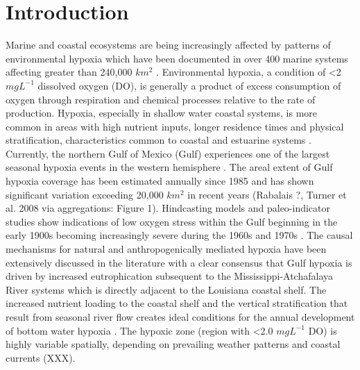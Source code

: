 \documentclass[10pt]{article}
\begin{document}
\section*{Introduction}
Marine and coastal ecosystems are being increasingly affected by patterns of environmental hypoxia which have been documented in over 400 marine systems affecting greater than 240,000 $km^{2}$ \cite{diaz_spreading_2008}.  Environmental hypoxia, a condition of \textless 2 $ mg{} L^{-1} $ dissolved oxygen (DO), is generally a product of excess consumption of oxygen through respiration and chemical processes relative to the rate of production.  Hypoxia, especially in shallow water coastal systems, is more common in areas with high nutrient inputs, longer residence times and physical stratification, characteristics common to coastal and estuarine systems \cite{rabalais_global_2009}.  Currently, the northern Gulf of Mexico (Gulf) experiences one of the largest seasonal hypoxia events in the western hemisphere \cite{rabalais_beyond_2002}.  The areal extent of Gulf hypoxia coverage has been estimated annually since 1985 and has shown significant variation exceeding 20,000 $ km^2 $ in recent years (Rabalais ?, Turner et al. 2008 via aggregations: Figure 1).  Hindcasting models and paleo-indicator studies show indications of low oxygen stress within the Gulf beginning in the early 1900s becoming increasingly severe during the 1960s and 1970s \cite{justic_forecasting_2007, rabalais_sediments_2007, greene_multiple_2009}.  The causal mechanisms for natural and anthropogenically mediated hypoxia have been extensively discussed in the literature \cite{bianchi_science_2010, rabalais_dynamics_2010, zhang_natural_2010} with a clear consensus that Gulf hypoxia is driven by increased eutrophication subsequent to the Mississippi-Atchafalaya River systems which is directly adjacent to the Louisiana coastal shelf.  The increased nutrient loading to the coastal shelf and the vertical stratification that result from seasonal river flow creates ideal conditions for the annual development of bottom water hypoxia \cite{rabalais_beyond_2002, bianchi_science_2010}.  The hypoxic zone (region with \textless 2.0 $ mg{} L^{-1} $ DO) is highly variable spatially, depending on prevailing weather patterns and coastal currents (XXX).
\end{document}
